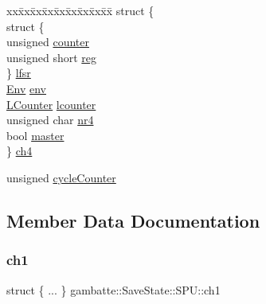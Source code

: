 \begin{DoxyCompactItemize}
\begin{tabbing}
\end{tabbing}\item 
\begin{tabbing}
xx\=xx\=xx\=xx\=xx\=xx\=xx\=xx\=xx\=\kill
struct \{\\
\>struct \{\\
\>\>unsigned \hyperlink{structgambatte_1_1SaveState_1_1SPU_aa950836b4cdeb642d7c2891826536b5d}{counter}\\
\>\>unsigned short \hyperlink{structgambatte_1_1SaveState_1_1SPU_a7d30f12abc09b3f8c6f4b88f63ad7265}{reg}\\
\>\} \hyperlink{structgambatte_1_1SaveState_1_1SPU_a53d6590772c1fa24ec428c00211279dd}{lfsr}\\
\>\hyperlink{structgambatte_1_1SaveState_1_1SPU_1_1Env}{Env} \hyperlink{structgambatte_1_1SaveState_1_1SPU_a39d86c1ace4a0e800fe73910a887ef24}{env}\\
\>\hyperlink{structgambatte_1_1SaveState_1_1SPU_1_1LCounter}{LCounter} \hyperlink{structgambatte_1_1SaveState_1_1SPU_ab0e4f21b99cff7f36a59855ecb00cbb1}{lcounter}\\
\>unsigned char \hyperlink{structgambatte_1_1SaveState_1_1SPU_a9395abdc0d09126fac7ca2edfeda9701}{nr4}\\
\>bool \hyperlink{structgambatte_1_1SaveState_1_1SPU_affe87b653ce5fc88a9cf550ad83d9437}{master}\\
\} \hyperlink{structgambatte_1_1SaveState_1_1SPU_a0faab2840aec3741d2229e44d3963c93}{ch4}\\

\end{tabbing}\item 
unsigned \hyperlink{structgambatte_1_1SaveState_1_1SPU_a2560277764c98a6796fe77250b24e9f7}{cycle\+Counter}
\end{DoxyCompactItemize}


\subsection{Member Data Documentation}
\mbox{\label{structgambatte_1_1SaveState_1_1SPU_a0249d80be054e4094494b63f5432b31f}} 
\subsubsection{\texorpdfstring{ch1}{ch1}}
{\footnotesize\ttfamily struct \{ ... \}   gambatte\+::\+Save\+State\+::\+S\+P\+U\+::ch1}


